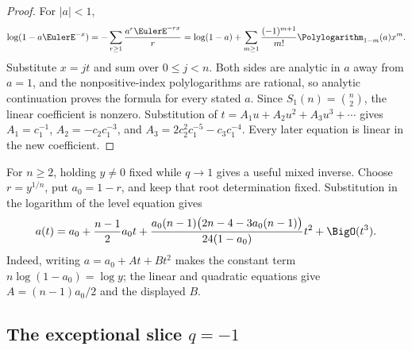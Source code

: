 \begin{proof}
For \(|a|<1\),
\[
 \log(1-a\EulerE^{-x})
 =-\sum_{r\geq1}\frac{a^r\EulerE^{-rx}}r
 =\log(1-a)+\sum_{m\geq1}
   \frac{(-1)^{m+1}}{m!}\Polylogarithm_{1-m}(a)x^m.
\]
Substitute \(x=jt\) and sum over \(0\leq j<n\).  Both sides are analytic in
\(a\) away from \(a=1\), and the nonpositive-index polylogarithms are rational,
so analytic continuation proves the formula for every stated \(a\).
Since \(S_1(n)=\binom n2\), the linear coefficient is nonzero.  Substitution
of \(t=A_1u+A_2u^2+A_3u^3+\cdots\) gives
\(A_1=c_1^{-1}\), \(A_2=-c_2c_1^{-3}\), and
\(A_3=2c_2^2c_1^{-5}-c_3c_1^{-4}\).  Every later equation is linear in the
new coefficient.
\end{proof}

For \(n\geq2\), holding \(y\ne0\) fixed while \(q\to1\) gives a useful mixed
inverse.  Choose \(r=y^{1/n}\), put \(a_0=1-r\), and keep that root
determination fixed.
Substitution in the logarithm of the level equation gives
\begin{equation}
 a(t)=a_0+\frac{n-1}{2}a_0t+
 \frac{a_0(n-1)\bigl(2n-4-3a_0(n-1)\bigr)}
 {24(1-a_0)}t^2+\BigO(t^3).
 \label{fp-fixed-target-argument}
\end{equation}
Indeed, writing \(a=a_0+At+Bt^2\) makes the constant term
\(n\log(1-a_0)=\log y\); the linear and quadratic equations give
\(A=(n-1)a_0/2\) and the displayed \(B\).

\subsection{The exceptional slice \(q=-1\)}
\label{fp-minus-one-section}

